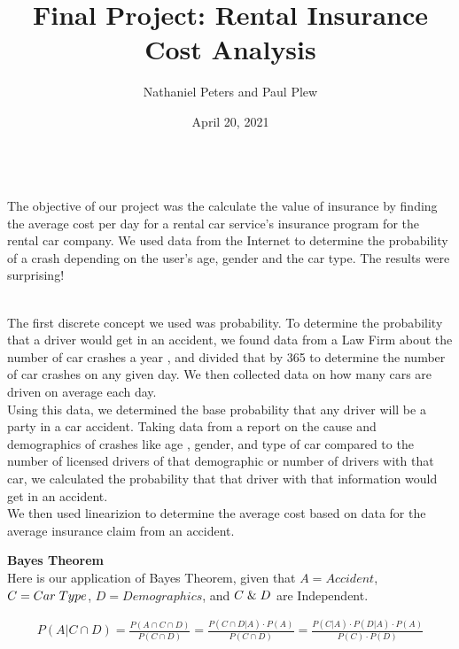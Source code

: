 \documentclass[12 pt]{article}
\title{Final Project: Rental Insurance Cost Analysis}
\author{Nathaniel Peters and Paul Plew}
\date{April 20, 2021}
\renewcommand{\section}[1]{\bigskip \bigskip \par \noindent {\large \bf #1} \\[2ex]}
\renewcommand{\subsection}[1]{\medskip \par {\bf #1} \\[2ex]}
\begin{document}
\maketitle 

\section{Introduction}
\indent The objective of our project was the calculate the value of insurance by finding the average cost per day for a rental car service’s insurance program for the rental car company. We used data from the Internet to determine the probability of a crash depending on the user's age, gender and the car type. The results were surprising!

\section{Topics Explored}
\indent The first discrete concept we used was probability. To determine the probability that a driver would get in an accident, we found data from a Law Firm about the number of car crashes a year \cite{accidents}, and divided that by 365 to determine the number of car crashes on any given day. We then collected data on how many cars are driven on average each day.\\ 
Using this data, we determined the base probability that any driver will be a party in a car accident. Taking data from a report on the cause and demographics of crashes like age \cite{licensed}, gender, and type of car \cite{survey} compared to the number of licensed drivers of that demographic or number of drivers with that car, we calculated the probability that that driver with that information would get in an accident.\\
We then used linearizion to determine the average cost based on data for the average insurance claim from an accident\cite{crash}.\\

\subsection{Bayes Theorem}
\indent Here is our application of Bayes Theorem, given that $A=Accident$, $C=Car \hspace{1mm} Type$, $D=Demographics$, and $C\hspace{1mm}\&\hspace{1mm}D$ are Independent.

\begin{align*}
  P(A|C \cap D)=\frac{P(A\cap C \cap D)}{P(C \cap D)}=\frac{P(C \cap D|A) \cdot P(A)}{P(C \cap D)}=\frac{P(C |A) \cdot P(D|A)\cdot P(A)}{P(C) \cdot P(D)}
\end{align*}
\end{document}
